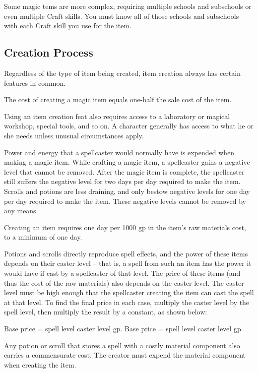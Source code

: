Some magic tems are more complex, requiring multiple schools and subschools or even multiple Craft skills. You must know all of those schools and subschools with each Craft skill you use for the item.

\subsection{Creation Process}
Regardless of the type of item being created, item creation always has certain features in common.

 The cost of creating a magic item equals one-half the sale cost of the item.

Using an item creation feat also requires access to a laboratory or magical workshop, special tools, and so on. A character generally has access to what he or she needs unless unusual circumstances apply.

 Power and energy that a spellcaster would normally have is expended when making a magic item. While crafting a magic item, a spellcaster gains a negative level that cannot be removed. After the magic item is complete, the spellcaster still suffers the negative level for two days per day required to make the item. Scrolls and potions are less draining, and only bestow negative levels for one day per day required to make the item. These negative levels cannot be removed by any means.

 Creating an item requires one day per 1000 gp in the item's raw materials cost, to a minimum of one day.

 Potions and scrolls directly reproduce spell effects, and the power of these items depends on their caster level -- that is, a spell from such an item has the power it would have if cast by a spellcaster of that level. The price of these items (and thus the cost of the raw materials) also depends on the caster level. The caster level must be high enough that the spellcaster creating the item can cast the spell at that level. To find the final price in each case, multiply the caster level by the spell level, then multiply the result by a constant, as shown below:

 Base price = spell level \mtimes caster level  gp.
 Base price = spell level \mtimes  caster level  gp.

 Any potion or scroll that stores a spell with a costly material component also carries a commensurate cost. The creator must expend the material component when creating the item.

